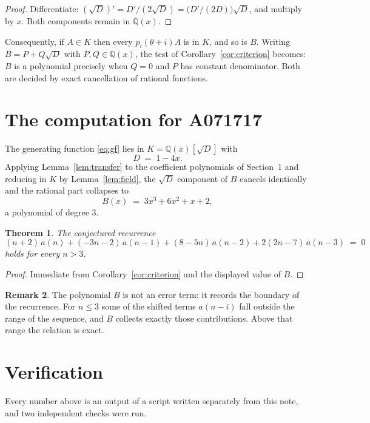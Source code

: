 \documentclass[11pt,a4paper]{article}
\theoremstyle{plain}
\newtheorem{theorem}{Theorem}
\theoremstyle{definition}
\newtheorem{remark}[theorem]{Remark}
\begin{document}
\begin{proof}
Differentiate: $(\sqrt{D})'=D'/(2\sqrt{D})=\bigl(D'/(2D)\bigr)\sqrt{D}$, and multiply by
$x$. Both components remain in $\mathbb{Q}(x)$.
\end{proof}

Consequently, if $A\in K$ then every $p_{i}(\theta+i)A$ is in $K$, and so is $B$. Writing
$B=P+Q\sqrt{D}$ with $P,Q\in\mathbb{Q}(x)$, the test of Corollary~\ref{cor:criterion}
becomes: $B$ is a polynomial precisely when $Q=0$ and $P$ has constant denominator. Both
are decided by exact cancellation of rational functions.

\section{The computation for A071717}

The generating function \eqref{eq:gf} lies in $K=\mathbb{Q}(x)[\sqrt{D}]$ with
\[
D \;=\; 1 - 4 x .
\]
Applying Lemma~\ref{lem:transfer} to the coefficient polynomials of Section~1 and reducing
in $K$ by Lemma~\ref{lem:field}, the $\sqrt{D}$ component of $B$ cancels identically and
the rational part collapses to
\[
B(x)\;=\;3 x^{3} + 6 x^{2} + x + 2 ,
\]
a polynomial of degree $3$.

\begin{theorem}
The conjectured recurrence
\[
(n + 2)\,a(n) + (- 3 n - 2)\,a(n-1) + (8 - 5 n)\,a(n-2) + 2 \left(2 n - 7\right)\,a(n-3) \;=\;0
\]
holds for every $n>3$.
\end{theorem}

\begin{proof}
Immediate from Corollary~\ref{cor:criterion} and the displayed value of $B$.
\end{proof}

\begin{remark}
The polynomial $B$ is not an error term: it records the boundary of the recurrence. For
$n\le3$ some of the shifted terms $a(n-i)$ fall outside the range of the sequence,
and $B$ collects exactly those contributions. Above that range the relation is exact.
\end{remark}

\section{Verification}

Every number above is an output of a script written separately from this note, and two
independent checks were run.
\end{document}

